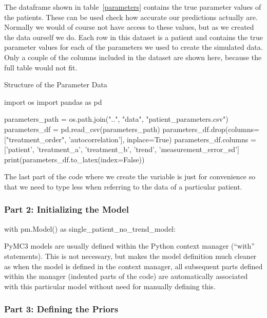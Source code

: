 \documentclass[12pt,a4paper,leqno]{report}
\theoremstyle{plain}
\theoremstyle{definition}
\theoremstyle{remark}
\begin{document}
The  dataframe shown in table\ \ref{parameters} contains the true parameter values of the patients. These
can be used check how accurate our predictions actually are. Normally we would of course
not have access to these values, but as we created the data ourself we do. Each row in
this dataset is a patient and contains the
true parameter values for each of the parameters we used to create the simulated data.
Only a couple of the columns included in the dataset are shown here, because the full
table would not fit.

\bigskip
\begin{table}[H]
\caption{Structure of the Parameter Data}\label{parameters}
\bigskip
\centering
\begin{pycode}
import os
import pandas as pd

parameters_path = os.path.join("..", "data", "patient_parameters.csv")
parameters_df = pd.read_csv(parameters_path)
parameters_df.drop(columns=["treatment_order", 'autocorrelation'], inplace=True)
parameters_df.columns = ['patient', 'treatment_a', 'treatment_b', 'trend', 'measurement_error_sd']
print(parameters_df.to_latex(index=False))
\end{pycode}
\end{table}
\bigskip

The last part of the code where we create the variable  is just for
convenience so that we need to type less when referring to the data of a particular patient.

\subsubsection*{Part 2: Initializing the Model}

\bigskip
\begin{pyverbatim}[][fontsize=\footnotesize]
with pm.Model() as single_patient_no_trend_model:
\end{pyverbatim}
\bigskip

PyMC3 models are usually defined within the Python context manager (``with'' statements).
This is not necessary, but makes the model definition much cleaner as when the model is
defined in the context manager, all subsequent parts defined within the manager
(indented parts of the code) are automatically associated with this particular model
without need for manually defining this.

\subsubsection*{Part 3: Defining the Priors}
\end{document}
